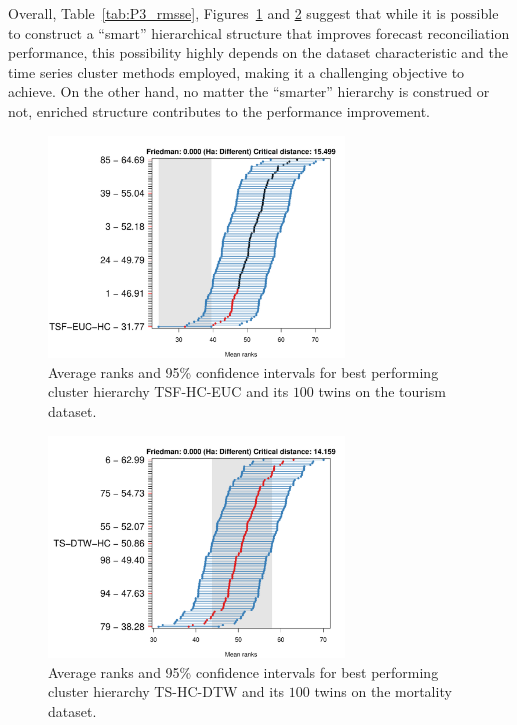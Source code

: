 \documentclass[a4paper,review,12pt,authoryear]{elsarticle}
\begin{document}
Overall, Table~\ref{tab:P3_rmsse}, Figures~\ref{fig:P3_tourism_c_vs_pc} and \ref{fig:P3_mortality_c_vs_pc} suggest that while it is possible to construct a ``smart'' hierarchical structure that improves forecast reconciliation performance, this possibility highly depends on the dataset characteristic and the time series cluster methods employed, making it a challenging objective to achieve. On the other hand, no matter the ``smarter'' hierarchy is construed or not, enriched structure contributes to the performance improvement.


\begin{figure}[!h]
    \centering
    \includegraphics[width=0.7\textwidth]{figures/hierarchy_rmsse/tourism/P3_cluster_vs_pc_h12.pdf}
    \caption{\label{fig:P3_tourism_c_vs_pc}Average ranks and 95\% confidence intervals for best performing cluster hierarchy TSF-HC-EUC and its $100$ twins on the tourism dataset.}
\end{figure}

\begin{figure}[!h]
    \centering
    \includegraphics[width=0.7\textwidth]{figures/hierarchy_rmsse/mortality/P3_cluster_vs_pc_h12.pdf}
    \caption{\label{fig:P3_mortality_c_vs_pc}Average ranks and 95\% confidence intervals for best performing cluster hierarchy TS-HC-DTW and its $100$ twins on the mortality dataset.}
\end{figure}
\end{document}
